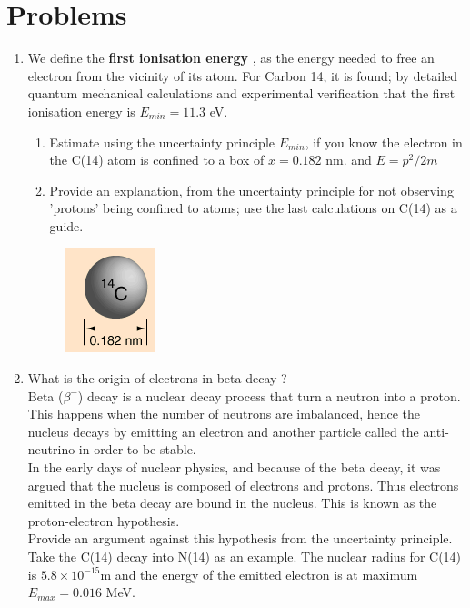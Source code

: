   \section{Problems}
  \begin{enumerate}
  	\item We define the \textbf{first ionisation energy }, as the energy needed to free an electron from the vicinity of its atom. For Carbon 14, it is found; by detailed quantum mechanical calculations and experimental verification that the first ionisation energy is $ E_{min} = 11.3$ eV.
  	\begin{enumerate}
  		\item Estimate using the uncertainty principle $ E_{min}$, if you know the electron in the C(14) atom is confined to a box of $ x= 0.182$ nm. and $ E= p^2/ 2m$ 
  		\item Provide an explanation, from the uncertainty principle for not observing 'protons' being confined to atoms; use the last calculations on C(14) as a guide.
  	\end{enumerate}
  	\begin{figure}[h!]
  		\centering
  		\includegraphics[scale= 0.6]{./figures/c_atom}
  	\end{figure}
  	\item 	What is the origin of electrons in beta decay ?\\
  	Beta ($\beta^-$) decay is a nuclear decay process that turn a neutron into a proton. This happens when the number of neutrons are imbalanced, hence the nucleus decays by emitting an electron and another particle called the  anti-neutrino in order to be stable.\\ In the early days of nuclear physics, and because of the beta decay, it was argued that the nucleus is composed of electrons and protons. Thus electrons emitted in the beta decay are bound in the nucleus. This is known as the proton-electron hypothesis.\\ Provide an argument against this hypothesis from the uncertainty principle. Take the C(14) decay into N(14) as an example. The nuclear radius for C(14) is $ 5.8 \times 10^{-15} $m and the energy of the emitted electron is at maximum $ E_{max} = 0.016$ MeV. 	

\end{enumerate}
